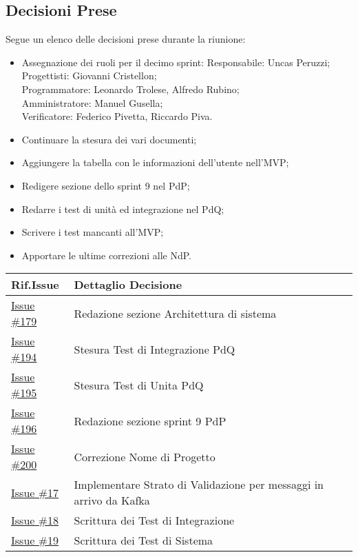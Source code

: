 \documentclass[10pt]{article}
\begin{document}
\subsection{Decisioni Prese}
Segue un elenco delle decisioni prese durante la riunione:
\begin{itemize}
    \item   Assegnazione dei ruoli per il decimo sprint:
            Responsabile: Uncas Peruzzi;\\
            Progettisti: Giovanni Cristellon;\\
            Programmatore: Leonardo Trolese, Alfredo Rubino;\\
            Amministratore: Manuel Gusella;\\
            Verificatore: Federico Pivetta, Riccardo Piva.
    \item Continuare la stesura dei vari documenti;
    \item Aggiungere la tabella con le informazioni dell'utente nell'MVP;
    \item Redigere sezione dello sprint 9 nel PdP;
    \item Redarre i test di unità ed integrazione nel PdQ;
    \item Scrivere i test mancanti all'MVP;
    \item Apportare le ultime correzioni alle NdP.
\end{itemize}

\begin{center}
    \begin{tabular}{|>{\centering\arraybackslash}m{3cm}|>{\centering\arraybackslash}m{12cm}|}
	\hline
	\textbf{Rif.Issue} & \textbf{Dettaglio Decisione}\\
	\hline  
            \href{https://github.com/SevenBitsSwe/7BitsDocs/issues/179}{Issue \#179} & Redazione sezione Architettura di sistema\\
        \hline
            \href{https://github.com/SevenBitsSwe/7BitsDocs/issues/194}{Issue \#194} & Stesura Test di Integrazione PdQ\\
        \hline
            \href{https://github.com/SevenBitsSwe/7BitsDocs/issues/195}{Issue \#195} & Stesura Test di Unita PdQ\\
        \hline
            \href{https://github.com/SevenBitsSwe/7BitsDocs/issues/196}{Issue \#196} & Redazione sezione sprint 9 PdP\\
        \hline
            \href{https://github.com/SevenBitsSwe/7BitsDocs/issues/200}{Issue \#200} & Correzione Nome di Progetto\\
        \hline
            \href{https://github.com/SevenBitsSwe/MVP/issues/17}{Issue \#17} & Implementare Strato di Validazione per messaggi in arrivo da Kafka\\
        \hline
            \href{https://github.com/SevenBitsSwe/MVP/issues/18}{Issue \#18} & Scrittura dei Test di Integrazione\\
        \hline
            \href{https://github.com/SevenBitsSwe/MVP/issues/19}{Issue \#19} & Scrittura dei Test di Sistema\\
        \hline
    \end{tabular}
\end{center}
\end{document}
